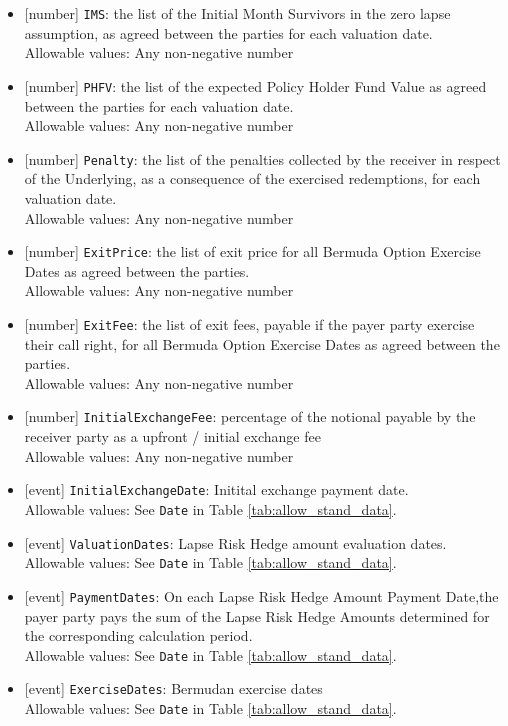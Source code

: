 \begin{itemize}
  Allowable values: Any non-negative number
  \item{}[number] \lstinline!IMS!: the list of the Initial Month Survivors in the zero lapse assumption, as agreed between the parties for each valuation date. \\
  Allowable values: Any non-negative number
  \item{}[number] \lstinline!PHFV!: the list of the  expected  Policy  Holder  Fund  Value  as  agreed between the parties for each valuation date.  \\
  Allowable values: Any non-negative number
  \item{}[number] \lstinline!Penalty!: the list of the penalties collected  by the receiver in  respect  of  the Underlying, as a consequence of the exercised redemptions, for each valuation date.  \\
  Allowable values: Any non-negative number
  \item{}[number] \lstinline!ExitPrice!: the list of exit price for all Bermuda Option Exercise Dates as agreed between the parties.   \\
  Allowable values: Any non-negative number
  \item{}[number] \lstinline!ExitFee!:  the list of exit fees, payable if the payer party exercise their call right, for all Bermuda Option Exercise Dates as agreed between the parties. \\
  Allowable values: Any non-negative number
  \item{}[number] \lstinline!InitialExchangeFee!: percentage of the notional payable by the receiver party as a upfront / initial exchange fee \\
  Allowable values: Any non-negative number
  \item{}[event] \lstinline!InitialExchangeDate!: Initital exchange payment date. \\
  Allowable values: See \lstinline!Date! in Table \ref{tab:allow_stand_data}.
  \item{}[event] \lstinline!ValuationDates!: Lapse Risk Hedge amount evaluation dates. \\
  Allowable values: See \lstinline!Date! in Table \ref{tab:allow_stand_data}.
  \item{}[event] \lstinline!PaymentDates!: On  each Lapse  Risk  Hedge Amount Payment Date,the payer party pays the sum of the Lapse Risk Hedge Amounts determined for the corresponding calculation period. \\
  Allowable values: See \lstinline!Date! in Table \ref{tab:allow_stand_data}.
  \item{}[event] \lstinline!ExerciseDates!: Bermudan exercise dates \\
  Allowable values: See \lstinline!Date! in Table \ref{tab:allow_stand_data}.
\end{itemize}

